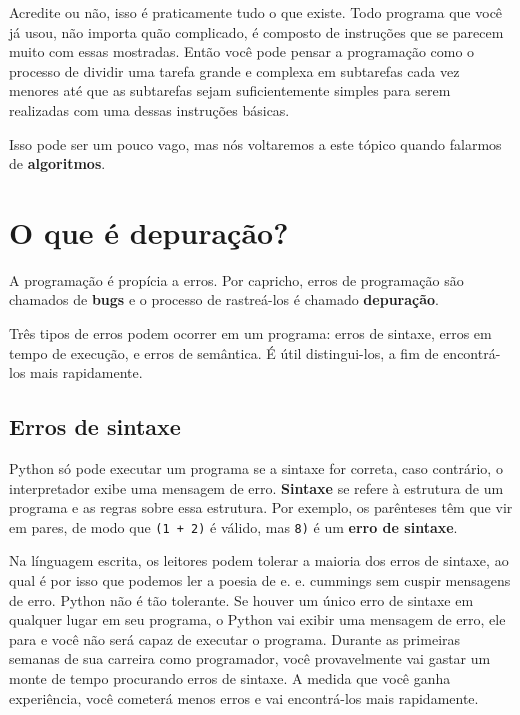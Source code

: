 \documentclass[10pt]{book}
\begin{document}
Acredite ou não, isso é praticamente tudo o que existe. Todo
programa que você já usou, não importa quão complicado, é composto de
instruções que se parecem muito com essas mostradas. Então você pode pensar
a programação como o processo de dividir uma tarefa grande e complexa
em subtarefas cada vez menores até que as subtarefas sejam
suficientemente simples para serem realizadas com uma dessas instruções básicas.

Isso pode ser um pouco vago, mas nós voltaremos a este tópico
quando falarmos de {\bf algoritmos}.

\section{O que é depuração?}

A programação é propícia a erros. Por capricho, erros de programação
são chamados de {\bf bugs} e o processo de rastreá-los é chamado
{\bf depuração}.

Três tipos de erros podem ocorrer em um programa: erros de sintaxe, erros
em tempo de execução, e erros de semântica. É útil
distingui-los, a fim de encontrá-los mais rapidamente.

\subsection{Erros de sintaxe}

Python só pode executar um programa se a sintaxe for
correta, caso contrário, o interpretador exibe uma mensagem de erro.
{\bf Sintaxe} se refere à estrutura de um programa e as regras sobre
essa estrutura.
Por exemplo, os parênteses têm que vir em pares, de modo que
{\tt (1 + 2)} é válido, mas {\tt 8)} é um {\bf erro de sintaxe}.

Na línguagem escrita, os leitores podem tolerar a maioria dos erros de sintaxe, ao qual é por isso que
podemos ler a poesia de e. e. cummings sem cuspir mensagens de erro.
Python não é tão tolerante. Se houver um único erro de sintaxe
em qualquer lugar em seu programa, o Python vai exibir uma mensagem de erro, ele para
e você não será capaz de executar o programa. Durante as primeiras
semanas de sua carreira como programador, você provavelmente vai gastar um monte de
tempo procurando erros de sintaxe. A medida que você ganha experiência, você
cometerá menos erros e vai encontrá-los mais rapidamente.
\end{document}
